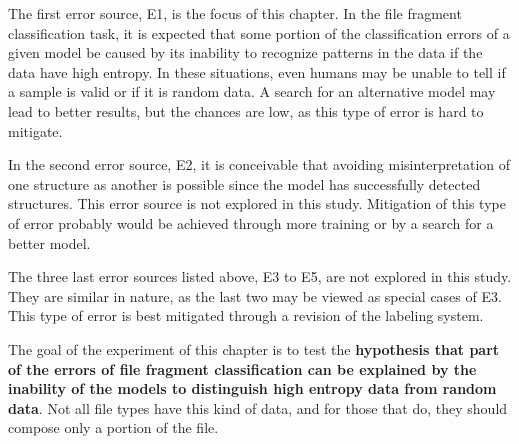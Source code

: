 The first error source, E1, is the focus of this chapter. In the file fragment classification task, it is expected that some portion of the classification errors of a given model be caused by its inability to recognize patterns in the data if the data have high entropy. In these situations, even humans may be unable to tell if a sample is valid or if it is random data. A search for an alternative model may lead to better results, but the chances are low, as this type of error is hard to mitigate. 

In the second error source, E2, it is conceivable that avoiding misinterpretation of one structure as another is possible since the model has successfully detected structures. This error source is not explored in this study. Mitigation of this type of error probably would be achieved through more training or by a search for a better model.

The three last error sources listed above, E3 to E5, are not explored in this study. They are similar in nature, as the last two may be viewed as special cases of E3. This type of error is best mitigated through a revision of the labeling system.

The goal of the experiment of this chapter is to test the \textbf{hypothesis that part of the errors of file fragment classification can be explained by the inability of the models to distinguish high entropy data from random data}. Not all file types have this kind of data, and for those that do, they should compose only a portion of the file.

